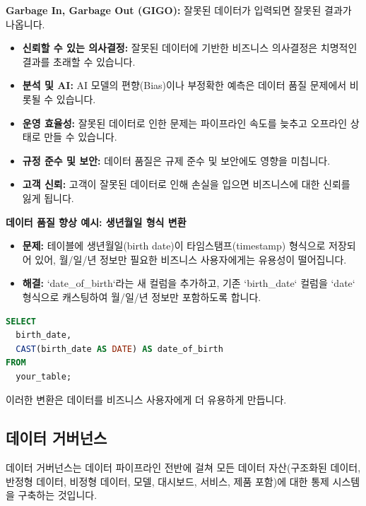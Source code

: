 \documentclass[11pt,a4paper]{article}
\begin{document}
\begin{enumerate}
\begin{warningbox}
\textbf{Garbage In, Garbage Out (GIGO):} 잘못된 데이터가 입력되면 잘못된 결과가 나옵니다.
\begin{itemize}
    \item \textbf{신뢰할 수 있는 의사결정:} 잘못된 데이터에 기반한 비즈니스 의사결정은 치명적인 결과를 초래할 수 있습니다.
    \item \textbf{분석 및 AI:} AI 모델의 편향(Bias)이나 부정확한 예측은 데이터 품질 문제에서 비롯될 수 있습니다.
    \item \textbf{운영 효율성:} 잘못된 데이터로 인한 문제는 파이프라인 속도를 늦추고 오프라인 상태로 만들 수 있습니다.
    \item \textbf{규정 준수 및 보안:} 데이터 품질은 규제 준수 및 보안에도 영향을 미칩니다.
    \item \textbf{고객 신뢰:} 고객이 잘못된 데이터로 인해 손실을 입으면 비즈니스에 대한 신뢰를 잃게 됩니다.
\end{itemize}
\end{warningbox}

\begin{examplebox}
\textbf{데이터 품질 향상 예시: 생년월일 형식 변환}
\begin{itemize}
    \item \textbf{문제:} 테이블에 생년월일(birth date)이 타임스탬프(timestamp) 형식으로 저장되어 있어, 월/일/년 정보만 필요한 비즈니스 사용자에게는 유용성이 떨어집니다.
    \item \textbf{해결:} `date_of_birth`라는 새 컬럼을 추가하고, 기존 `birth_date` 컬럼을 `date` 형식으로 캐스팅하여 월/일/년 정보만 포함하도록 합니다.
\end{itemize}
\begin{lstlisting}[language=sql, caption={생년월일 형식 변환 예시}, label={lst:birth_date_conversion}]
SELECT
  birth_date,
  CAST(birth_date AS DATE) AS date_of_birth
FROM
  your_table;
\end{lstlisting}
이러한 변환은 데이터를 비즈니스 사용자에게 더 유용하게 만듭니다.
\end{examplebox}

\newpage
\subsection{데이터 거버넌스}

데이터 거버넌스는 데이터 파이프라인 전반에 걸쳐 모든 데이터 자산(구조화된 데이터, 반정형 데이터, 비정형 데이터, 모델, 대시보드, 서비스, 제품 포함)에 대한 통제 시스템을 구축하는 것입니다.


\end{enumerate}
\end{document}
